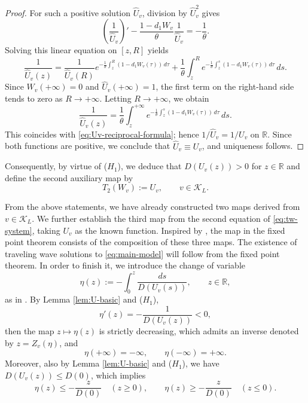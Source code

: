 \documentclass[preprint,sort&compress,final,12pt]{elsarticle}
\numberwithin{equation}{section}
\begin{document}
\begin{proof}
For such a positive solution $\widehat U_v$, division by $\widehat U_v^2$ gives
\begin{equation*}
\left(\frac{1}{\widehat U_v}\right)'
-\frac{1-d_1W_v}{\theta}\frac{1}{\widehat U_v}
=-\frac{1}{\theta}.
\end{equation*}
Solving this linear equation on $[z,R]$ yields
\begin{equation*}
\frac{1}{\widehat U_v(z)}
=\frac{1}{\widehat U_v(R)}e^{-\frac{1}{\theta}\int_z^R(1-d_1W_v(\tau))\,d\tau}
+\frac{1}{\theta}\int_z^Re^{-\frac{1}{\theta}\int_z^s(1-d_1W_v(\tau))\,d\tau}\,ds.
\end{equation*}
Since $W_v(+\infty)=0$ and $\widehat U_v(+\infty)=1$, the first term on the right-hand side tends to zero as $R\to+\infty$. Letting $R\to+\infty$, we obtain
\begin{equation*}
\frac{1}{\widehat U_v(z)}=\frac{1}{\theta}\int_z^{+\infty}e^{-\frac{1}{\theta}\int_z^s(1-d_1W_v(\tau))\,d\tau}\,ds.
\end{equation*}
This coincides with \eqref{eq:Uv-reciprocal-formula}; hence
$1/\widehat U_v=1/U_v$ on $\mathbb R$. Since both functions are positive, we conclude that $\widehat U_v\equiv U_v$, and uniqueness follows.
\end{proof}


Consequently, by virtue of ($H_1$), we deduce that $D(U_v(z))>0$ for $z\in\mathbb{R}$ and define the second auxiliary map by
\begin{equation*}
T_2(W_v):=U_v,\qquad v\in\mathcal K_L.
\end{equation*}

From the above statements, we have already constructed two maps derived from $v\in\mathcal K_L$. We further establish the third map from the second equation of \eqref{eq:tw-system}, taking $U_v$ as the known function. Inspired by \cite{ChenQi2025}, the map in the fixed point theorem consists of the composition of these three maps. The existence of traveling wave solutions to \eqref{eq:main-model} will follow from the fixed point theorem. In order to finish it, we introduce the change of variable
\begin{equation}\label{defeta}
\eta(z):=-\int_0^z\frac{ds}{D(U_v(s))},
\qquad z\in\mathbb R,
\end{equation}
as in \cite{gm22,ChenQi2025}. By Lemma \ref{lem:U-basic} and ($H_1$),
\begin{equation*}
\eta'(z)=-\frac{1}{D(U_v(z))}<0,
\end{equation*}
then the map $z\mapsto\eta(z)$ is strictly decreasing, which admits an inverse denoted by $z=Z_v(\eta)$, and
\begin{equation*}
\eta(+\infty)=-\infty,\qquad \eta(-\infty)=+\infty.
\end{equation*}
Moreover, also by Lemma \ref{lem:U-basic} and ($H_1$), we have $D(U_v(z))\le D(0)$, which implies
\begin{equation}\label{eq:eta-growth}
\eta(z)\le -\frac{z}{D(0)}\quad (z\ge0),\qquad
\eta(z)\ge -\frac{z}{D(0)}\quad (z\le0).
\end{equation}
\end{document}
